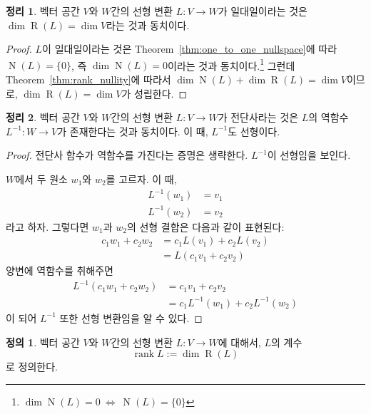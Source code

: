 \documentclass[unfonts,oneside,a4paper]{oblivoir}
\theoremstyle{definition}
\newtheorem{definition}{정의}
\theoremstyle{theorem}
\newtheorem{theorem}{정리}
\theoremstyle{remark}
\theoremstyle{remark}
\theoremstyle{remark}
\theoremstyle{remark}
\renewcommand{\vec}[1]{\bm{\mathit{#1}}}
\newcommand{\vecz}{\bm{\mathrm{0}}}
\DeclareMathOperator{\Null}{N}
\DeclareMathOperator{\Range}{R}
\DeclareMathOperator{\rank}{rank}
\begin{document}
\begin{theorem} \label{thm:one_to_one_range}
    벡터 공간 $V$와 $W$간의 선형 변환 $L: V \rightarrow W$가 일대일이라는 것은 $\dim \Range (L) = \dim V$라는 것과 동치이다.
\end{theorem}

\begin{proof}
    $L$이 일대일이라는 것은 Theorem~\ref{thm:one_to_one_nullspace}에 따라 $\Null (L) = \{\vecz\}$, 즉 $\dim \Null (L) = 0$이라는 것과 동치이다.\footnote{$\dim \Null (L) = 0\ \Leftrightarrow\ \Null (L) = \{\vecz\}$}
    그런데 Theorem~\ref{thm:rank_nullity}에 따라서 $\dim \Null (L) + \dim \Range (L) = \dim V$이므로, $\dim \Range(L) = \dim V$가 성립한다.
\end{proof}

\begin{theorem} \label{thm:inverse}
    벡터 공간 $V$와 $W$간의 선형 변환 $L: V \rightarrow W$가 전단사라는 것은 $L$의 역함수 $L^{-1}: W \rightarrow V$가 존재한다는 것과 동치이다.
    이 때, $L^{-1}$도 선형이다.
\end{theorem}

\begin{proof}
    전단사 함수가 역함수를 가진다는 증명은 생략한다.
    $L^{-1}$이 선형임을 보인다.

    $W$에서 두 원소 $\vec w_1$와 $\vec w_2$를 고르자.
    이 때,
    \begin{align*}
        L^{-1}(\vec w_1) &= \vec v_1\\
        L^{-1}(\vec w_2) &= \vec v_2
    \end{align*}
    라고 하자.
    그렇다면 $\vec w_1$과 $\vec w_2$의 선형 결합은 다음과 같이 표현된다:
    \begin{align*}
        c_1 \vec w_1 + c_2 \vec w_2 &= c_1 L(\vec v_1) + c_2 L(\vec v_2)\\
                                &= L(c_1 \vec v_1 + c_2 \vec v_2)
    \end{align*}
    양변에 역함수를 취해주면
    \begin{align*}
        L^{-1}(c_1 \vec w_1 + c_2 \vec w_2) &= c_1 \vec v_1 + c_2 \vec v_2\\
                                     &= c_1 L^{-1}(\vec w_1) + c_2 L^{-1}(\vec w_2)
    \end{align*}
    이 되어 $L^{-1}$ 또한 선형 변환임을 알 수 있다.
\end{proof}

\begin{definition}
    벡터 공간 $V$와 $W$간의 선형 변환 $L: V \rightarrow W$에 대해서, $L$의 계수
    \begin{equation*}
        \rank L := \dim \Range(L)
    \end{equation*}
    로 정의한다.
\end{definition}
\end{document}
